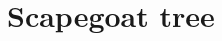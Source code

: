 \documentclass[12pt,a4paper,russian]{article}
\begin{document}

\section{Scapegoat tree}


\end{document}
